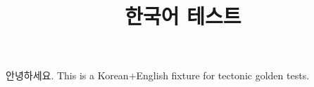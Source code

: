 \documentclass[12pt]{report}
\title{한국어 테스트}
\begin{document}
\maketitle
안녕하세요. This is a Korean+English fixture for tectonic golden tests.
\end{document}
